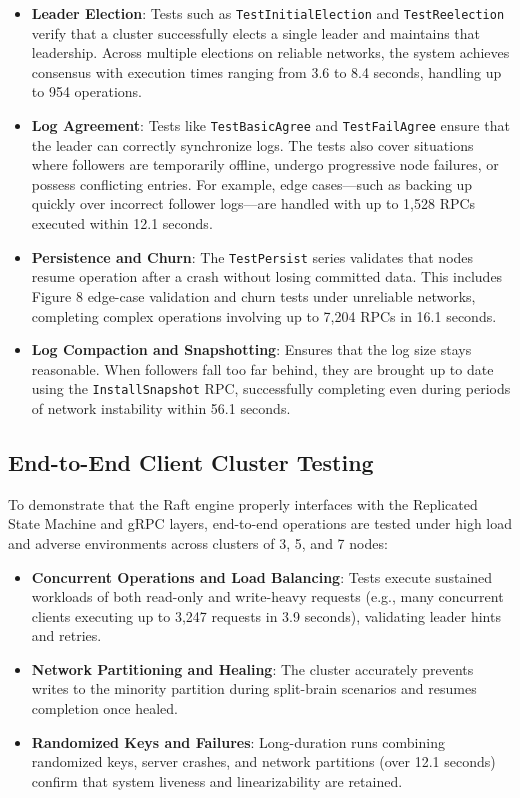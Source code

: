 \begin{itemize}
    \item \textbf{Leader Election}: Tests such as \texttt{TestInitialElection} and \texttt{TestReelection} verify that a cluster successfully elects a single leader and maintains that leadership. Across multiple elections on reliable networks, the system achieves consensus with execution times ranging from 3.6 to 8.4 seconds, handling up to 954 operations.
    
    \item \textbf{Log Agreement}: Tests like \texttt{TestBasicAgree} and \texttt{TestFailAgree} ensure that the leader can correctly synchronize logs. The tests also cover situations where followers are temporarily offline, undergo progressive node failures, or possess conflicting entries. For example, edge cases—such as backing up quickly over incorrect follower logs—are handled with up to 1,528 RPCs executed within 12.1 seconds.
    
    \item \textbf{Persistence and Churn}: The \texttt{TestPersist} series validates that nodes resume operation after a crash without losing committed data. This includes Figure 8 edge-case validation and churn tests under unreliable networks, completing complex operations involving up to 7,204 RPCs in 16.1 seconds.
    
    \item \textbf{Log Compaction and Snapshotting}: Ensures that the log size stays reasonable. When followers fall too far behind, they are brought up to date using the \texttt{InstallSnapshot} RPC, successfully completing even during periods of network instability within 56.1 seconds.
\end{itemize}

\subsection{End-to-End Client Cluster Testing}
To demonstrate that the Raft engine properly interfaces with the Replicated State Machine and gRPC layers, end-to-end operations are tested under high load and adverse environments across clusters of 3, 5, and 7 nodes:

\begin{itemize}
    \item \textbf{Concurrent Operations and Load Balancing}: Tests execute sustained workloads of both read-only and write-heavy requests (e.g., many concurrent clients executing up to 3,247 requests in 3.9 seconds), validating leader hints and retries.
    
    \item \textbf{Network Partitioning and Healing}: The cluster accurately prevents writes to the minority partition during split-brain scenarios and resumes completion once healed.
    
    \item \textbf{Randomized Keys and Failures}: Long-duration runs combining randomized keys, server crashes, and network partitions (over 12.1 seconds) confirm that system liveness and linearizability are retained.
\end{itemize}

